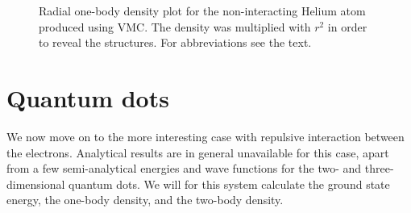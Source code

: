 \begin{figure}[H]
	\centering
	\captionsetup[subfigure]{labelformat=empty}
	\caption{Radial one-body density plot for the non-interacting Helium atom produced using VMC. The density was multiplied with $r^2$ in order to reveal the structures. For abbreviations see the text.}
	\label{fig:helium_nointeraction}
\end{figure}

\cleardoublepage
\section{Quantum dots} \label{sec:quantumdotresults}
We now move on to the more interesting case with repulsive interaction between the electrons. Analytical results are in general unavailable for this case, apart from a few semi-analytical energies and wave functions for the two- and three-dimensional quantum dots. We will for this system calculate the ground state energy, the one-body density, and the two-body density. 

